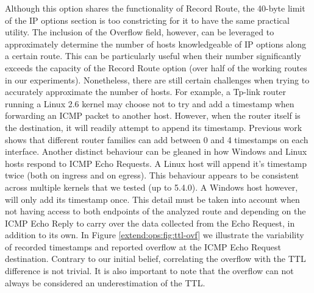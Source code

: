 Although this option shares the functionality of Record Route, the 40-byte limit of the IP options section is too constricting for it to have the same practical utility. The inclusion of the Overflow field, however, can be leveraged to approximately determine the number of hosts knowledgeable of IP options along a certain route. This can be particularly useful when their number significantly exceeds the capacity of the Record Route option (over half of the working routes in our experiments). Nonetheless, there are still certain challenges when trying to accurately approximate the number of hosts. For example, a Tp-link router running a Linux 2.6 kernel may choose not to try and add a timestamp when forwarding an ICMP packet to another host. However, when the router itself is the destination, it will readily attempt to append its timestamp. Previous work \cite{marchetta2017measuring} shows that different router families can add between 0 and 4 timestamps on each interface. Another distinct behaviour can be gleaned in how Windows and Linux hosts respond to ICMP Echo Requests. A Linux host will append it's timestamp twice (both on ingress and on egress). This behaviour appears to be consistent across multiple kernels that we tested (up to 5.4.0). A Windows host however, will only add its timestamp once. This detail must be taken into account when not having access to both endpoints of the analyzed route and depending on the ICMP Echo Reply to carry over the data collected from the Echo Request, in addition to its own. In Figure \ref{extend:ops:fig:ttl-ovf} we illustrate the variability of recorded timestamps and reported overflow at the ICMP Echo Request destination. Contrary to our initial belief, correlating the overflow with the TTL difference is not trivial. It is also important to note that the overflow can not always be considered an underestimation of the TTL.



